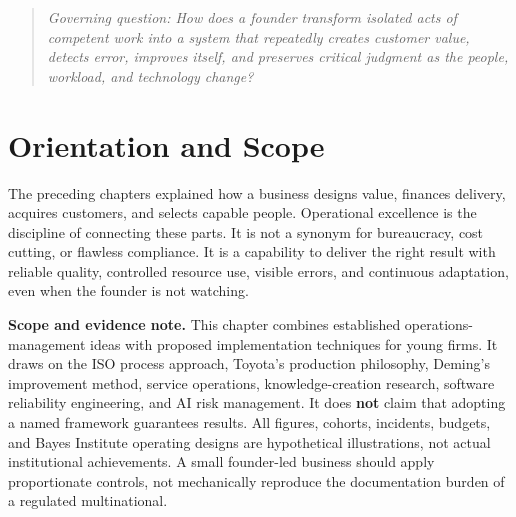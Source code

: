 
\begin{quote}
\textit{Governing question: How does a founder transform isolated acts of competent work into a system that repeatedly creates customer value, detects error, improves itself, and preserves critical judgment as the people, workload, and technology change?}
\end{quote}

\vspace{1.5pt}

\section*{Orientation and Scope}

The preceding chapters explained how a business designs value, finances delivery, acquires customers, and selects capable people. Operational excellence is the discipline of connecting these parts. It is not a synonym for bureaucracy, cost cutting, or flawless compliance. It is a capability to deliver the right result with reliable quality, controlled resource use, visible errors, and continuous adaptation, even when the founder is not watching.

\textbf{Scope and evidence note.} This chapter combines established operations-management ideas with proposed implementation techniques for young firms. It draws on the ISO process approach, Toyota's production philosophy, Deming's improvement method, service operations, knowledge-creation research, software reliability engineering, and AI risk management. It does \textbf{not} claim that adopting a named framework guarantees results. All figures, cohorts, incidents, budgets, and Bayes Institute operating designs are hypothetical illustrations, not actual institutional achievements. A small founder-led business should apply proportionate controls, not mechanically reproduce the documentation burden of a regulated multinational.


